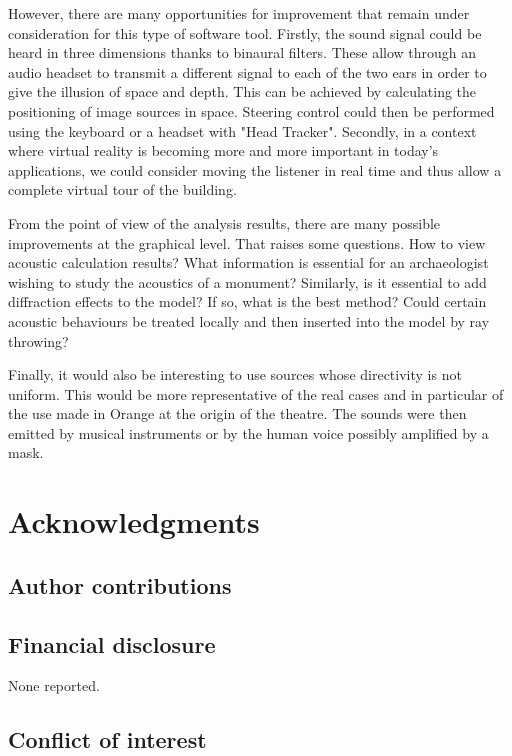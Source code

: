 \documentclass[AMA,STIX1COL]{WileyNJD-v2}
\begin{document}
However, there are many opportunities for improvement that remain under consideration for this type of software tool. Firstly, the sound signal could be heard in three dimensions thanks to binaural filters. These allow through an audio headset to transmit a different signal to each of the two ears in order to give the illusion of space and depth. This can be achieved by calculating the positioning of image sources in space. Steering control could then be performed using the keyboard or a headset with "Head Tracker". Secondly, in a context where virtual reality is becoming more and more important in today's applications, we could consider moving the listener in real time and thus allow a complete virtual tour of the building.

From the point of view of the analysis results, there are many possible improvements at the graphical level. That raises some questions. How to view acoustic calculation results? What information is essential for an archaeologist wishing to study the acoustics of a monument? Similarly, is it essential to add diffraction effects to the model? If so, what is the best method? Could certain acoustic behaviours be treated locally and then inserted into the model by ray throwing? 

Finally, it would also be interesting to use sources whose directivity is not uniform. This would be more representative of the real cases and in particular of the use made in Orange at the origin of the theatre. The sounds were then emitted by musical instruments or by the human voice possibly amplified by a mask.

\section*{Acknowledgments}


\subsection*{Author contributions}
 

\subsection*{Financial disclosure}

None reported.

\subsection*{Conflict of interest}
\end{document}
